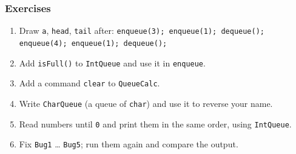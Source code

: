 \documentclass[aspectratio=169,10pt,compress]{beamer}
\begin{document}
\begin{frame}[t,fragile] \frametitle{Exercises}
  \begin{enumerate}\small
    \item Draw \texttt{a}, \texttt{head}, \texttt{tail} after: \texttt{enqueue(3); enqueue(1); dequeue(); enqueue(4); enqueue(1); dequeue();}
    \item Add \texttt{isFull()} to \texttt{IntQueue} and use it in \texttt{enqueue}.
    \item Add a command \texttt{clear} to \texttt{QueueCalc}.
    \item Write \texttt{CharQueue} (a queue of \texttt{char}) and use it to reverse your name.
    \item Read numbers until \texttt{0} and print them in the same order, using \texttt{IntQueue}.
    \item Fix \texttt{Bug1} \dots{} \texttt{Bug5}; run them again and compare the output.
  \end{enumerate}
\end{frame}




\begin{frame}[t,fragile]
	\begin{center}
		\vspace{4cm}
	\end{center}
\end{frame}
\end{document}
